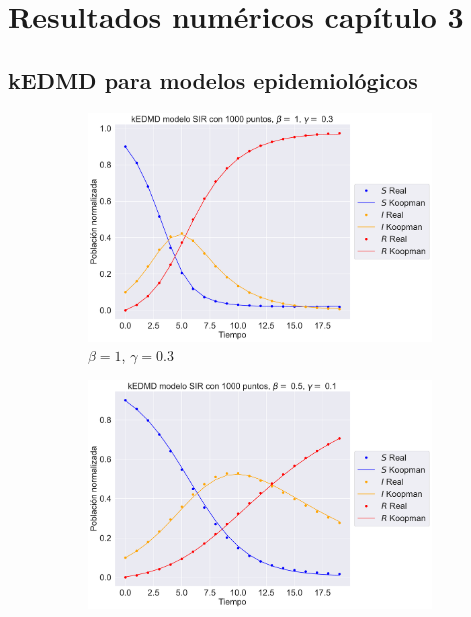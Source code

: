 \chapter{Resultados numéricos capítulo 3}

\section{kEDMD para modelos epidemiológicos}

\begin{figure}[htbp]
    \centering
    \begin{subfigure}[b]{0.45\textwidth}
        \centering
        \includegraphics[width=\textwidth]{img/content/chapter3/SIR1.pdf}
        \caption{$\beta=1$, $\gamma = 0.3$}
        \label{fig:SIR1}
    \end{subfigure}
    \hfill
    \begin{subfigure}[b]{0.45\textwidth}
        \centering
        \includegraphics[width=\textwidth]{img/content/chapter3/SIR2.pdf}

\end{subfigure}
\end{figure}
